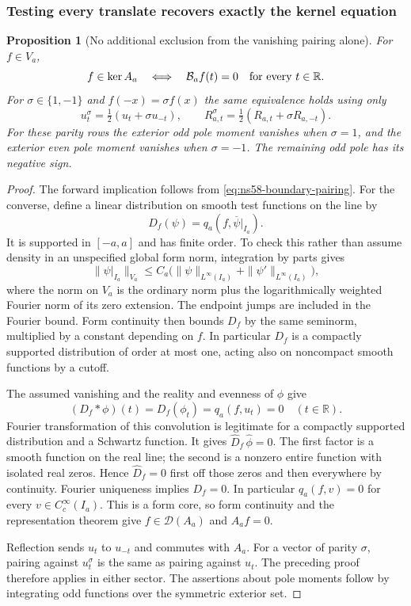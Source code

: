 \documentclass[11pt]{article}
\newtheorem{proposition}[theorem]{Proposition}
\theoremstyle{remark}
\begin{document}
\subsubsection{Testing every translate recovers exactly the kernel equation}

\begin{proposition}[No additional exclusion from the vanishing pairing alone]
\label{prop:ns58-equivalence}
For $f\in V_a$,
\begin{equation}\label{eq:ns58-equivalence}
 f\in\ker A_a
 \quad\Longleftrightarrow\quad
 \mathcal B_a f(t)=0\quad\hbox{for every }t\in\mathbb R.
\end{equation}
For $\sigma\in\{1,-1\}$ and $f(-x)=\sigma f(x)$ the same
equivalence holds using only
\[
 u_t^\sigma=\tfrac12(u_t+\sigma u_{-t}),\qquad
 R_{a,t}^\sigma=\tfrac12(R_{a,t}+\sigma R_{a,-t}).
\]
For these parity rows the exterior odd pole moment vanishes when
$\sigma=1$, and the exterior even pole moment vanishes when
$\sigma=-1$. The remaining odd pole has its negative sign.
\end{proposition}
\begin{proof}
The forward implication follows from
\eqref{eq:ns58-boundary-pairing}. For the converse, define a linear
distribution on smooth test functions on the line by
\[
 D_f(\psi)=q_a(f,\overline{\psi}|_{I_a}).
\]
It is supported in $[-a,a]$ and has finite order. To check this rather
than assume density in an unspecified global form norm, integration
by parts gives
\[
 \|\psi|_{I_a}\|_{V_a}
 \le C_a\bigl(\|\psi\|_{L^\infty(I_a)}
                +\|\psi'\|_{L^\infty(I_a)}\bigr),
\]
where the norm on $V_a$ is the ordinary norm plus the logarithmically
weighted Fourier norm of its zero extension. The endpoint jumps are
included in the Fourier bound. Form continuity then bounds $D_f$
by the same seminorm, multiplied by a constant depending on $f$.
In particular $D_f$ is a compactly supported distribution of order
at most one, acting also on noncompact smooth functions by a cutoff.

The assumed vanishing and the reality and evenness of $\phi$ give
\[
 (D_f*\phi)(t)=D_f(\phi_t)=q_a(f,u_t)=0\quad(t\in\mathbb R).
\]
Fourier transformation of this convolution is legitimate for a
compactly supported distribution and a Schwartz function. It gives
$\widehat D_f\,\widehat\phi=0$. The first factor is a smooth
function on the real line; the second is a nonzero entire function
with isolated real zeros. Hence $\widehat D_f=0$ first off those
zeros and then everywhere by continuity. Fourier uniqueness implies
$D_f=0$. In particular $q_a(f,v)=0$ for every
$v\in C_c^\infty(I_a)$. This is a form core, so form continuity
and the representation theorem give $f\in\mathcal D(A_a)$ and
$A_af=0$.

Reflection sends $u_t$ to $u_{-t}$ and commutes with $A_a$.
For a vector of parity $\sigma$, pairing against $u_t^\sigma$
is the same as pairing against $u_t$. The preceding proof therefore
applies in either sector. The assertions about pole moments follow
by integrating odd functions over the symmetric exterior set.
\end{proof}
\end{document}

